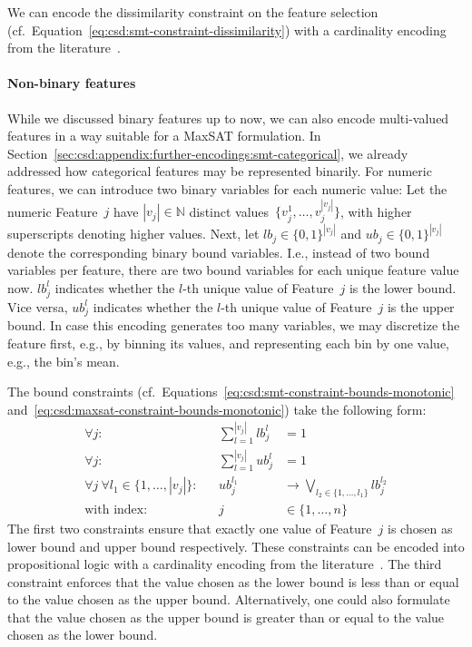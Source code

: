 \documentclass{article}
\theoremstyle{definition}
\begin{document}
We can encode the dissimilarity constraint on the feature selection (cf.~Equation~\ref{eq:csd:smt-constraint-dissimilarity}) with a cardinality encoding from the literature~\cite{sinz2005towards}.

\paragraph{Non-binary features}

While we discussed binary features up to now, we can also encode multi-valued features in a way suitable for a MaxSAT formulation.
In Section~\ref{sec:csd:appendix:further-encodings:smt-categorical}, we already addressed how categorical features may be represented binarily.
For numeric features, we can introduce two binary variables for each numeric value:
Let the numeric Feature~$j$ have $|v_j| \in \mathbb{N}$ distinct values~$\{v^1_j, \dots, v^{|v_j|}_j\}$, with higher superscripts denoting higher values.
Next, let $\mathit{lb}_j \in \{0, 1\}^{|v_j|}$ and $\mathit{ub}_j \in \{0, 1\}^{|v_j|}$ denote the corresponding binary bound variables.
I.e., instead of two bound variables per feature, there are two bound variables for each unique feature value now.
$\mathit{lb}^l_j$ indicates whether the $l$-th unique value of Feature~$j$ is the lower bound.
Vice versa, $\mathit{ub}^l_j$ indicates whether the $l$-th unique value of Feature~$j$ is the upper bound.
In case this encoding generates too many variables, we may discretize the feature first, e.g., by binning its values, and representing each bin by one value, e.g., the bin's mean.

The bound constraints (cf.~Equations~\ref{eq:csd:smt-constraint-bounds-monotonic} and~\ref{eq:csd:maxsat-constraint-bounds-monotonic}) take the following form:
%
\begin{equation}
	\begin{aligned}
		\forall j: & & \sum_{l=1}^{|v_j|} \mathit{lb}^l_j &= 1 \\
		\forall j: & & \sum_{l=1}^{|v_j|} \mathit{ub}^l_j &= 1 \\
		\forall j~ \forall l_1 \in \{1, \dots, |v_j|\}: & & \mathit{ub}^{l_1}_j &\rightarrow \bigvee_{l_2 \in \{1, \dots, l_1\}} \mathit{lb}^{l_2}_j \\
		\text{with index:} & & j &\in \{1, \dots, n\}
	\end{aligned}
	\label{eq:csd:maxsat-numeric-constraint-bounds-monotonic}
\end{equation}
%
The first two constraints ensure that exactly one value of Feature~$j$ is chosen as lower bound and upper bound respectively.
These constraints can be encoded into propositional logic with a cardinality encoding from the literature~\cite{sinz2005towards}.
The third constraint enforces that the value chosen as the lower bound is less than or equal to the value chosen as the upper bound.
Alternatively, one could also formulate that the value chosen as the upper bound is greater than or equal to the value chosen as the lower bound.
\end{document}
